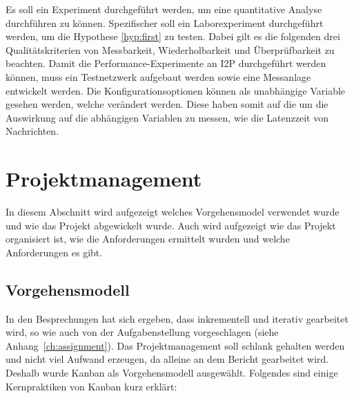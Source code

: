 Es soll ein Experiment durchgeführt werden, um eine quantitative Analyse durchführen zu können.
Spezifischer soll ein Laborexperiment durchgeführt werden, um die Hypothese \ref{hyp:first} zu testen.
Dabei gilt es die folgenden drei Qualitätskriterien von Messbarkeit, Wiederholbarkeit und Überprüfbarkeit zu beachten.
Damit die Performance-Experimente an I2P durchgeführt werden können, muss ein Testnetzwerk aufgebaut werden sowie eine Messanlage entwickelt werden.
Die Konfigurationsoptionen können als unabhängige Variable gesehen werden, welche verändert werden.
Diese haben somit auf die um die Auswirkung auf die abhängigen Variablen zu messen, wie die Latenzzeit von Nachrichten.
\parencite[S.~276]{helmut_balzert_wissenschaftliches_2017}

%
%

\parencite{helmut_balzert_wissenschaftliches_2017}


\section{Projektmanagement}\label{sec:projektinformationen}

In diesem Abschnitt wird aufgezeigt welches Vorgehensmodel verwendet wurde und wie das Projekt abgewickelt wurde.
Auch wird aufgezeigt wie das Projekt organisiert ist, wie die Anforderungen ermittelt wurden und welche Anforderungen es gibt.

\subsection{Vorgehensmodell}

In den Besprechungen hat sich ergeben, dass inkrementell und iterativ gearbeitet wird, so wie auch von der Aufgabenstellung vorgeschlagen (siehe Anhang~\ref{ch:assignment}).
Das Projektmanagement soll schlank gehalten werden und nicht viel Aufwand erzeugen, da alleine an dem Bericht gearbeitet wird.
Deshalb wurde Kanban als Vorgehensmodell ausgewählt.
Folgendes sind einige Kernpraktiken von Kanban kurz erklärt:

